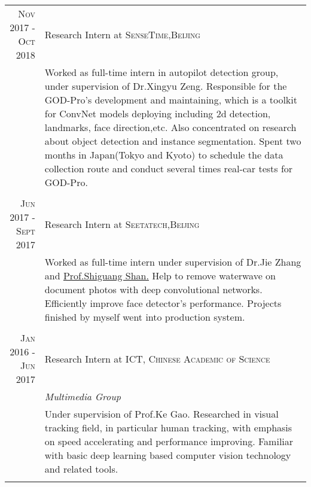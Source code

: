 \documentclass[a4paper,10pt]{article}
\begin{document}
\begin{tabular}{r|p{11cm}}

 \textsc{Nov 2017 - Oct 2018} & Research Intern at \textsc{SenseTime,Beijing} \\&\footnotesize{Worked as full-time intern in autopilot detection group, under supervision of Dr.Xingyu Zeng. Responsible for the GOD-Pro's development and maintaining, which is a toolkit for ConvNet models deploying including 2d detection, landmarks, face direction,etc. Also concentrated on research about object detection and instance segmentation. Spent two months in Japan(Tokyo and Kyoto) to schedule the data collection route and conduct several times real-car tests for GOD-Pro.}\\\multicolumn{2}{c}{} \\


 \textsc{Jun 2017 - Sept 2017} & Research Intern at \textsc{Seetatech,Beijing} \\&\footnotesize{Worked as full-time intern under supervision of Dr.Jie Zhang and} \href{http://www.jdl.ac.cn/user/sgshan/index_en.htm}{Prof.Shiguang Shan.} \footnotesize{Help to remove waterwave on document photos with deep convolutional networks. Efficiently improve face detector's performance. Projects finished by myself went into production system.}\\\multicolumn{2}{c}{} \\

 \textsc{Jan 2016 - Jun 2017} & Research Intern at \textsc{ICT, Chinese Academic of Science} \\&\emph{Multimedia Group}\\&\footnotesize{Under supervision of Prof.Ke Gao. Researched in visual tracking field, in particular human tracking, with emphasis on speed accelerating and performance improving. Familiar with basic deep learning based computer vision technology and related tools.}\\\multicolumn{2}{c}{} \\

\end{tabular}
\end{document}
